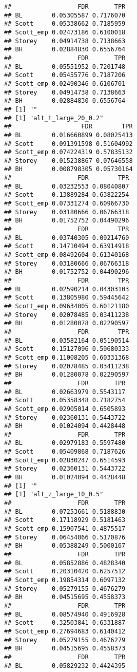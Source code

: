 \documentclass{article}\usepackage[]{graphicx}\usepackage[]{color}
\makeatletter
\newenvironment{kframe}{%
 \def\at@end@of@kframe{}%
 \ifinner\ifhmode%
  \def\at@end@of@kframe{\end{minipage}}%
  \begin{minipage}{\columnwidth}%
 \fi\fi%
 \def\FrameCommand##1{\hskip\@totalleftmargin \hskip-\fboxsep
 \colorbox{shadecolor}{##1}\hskip-\fboxsep
     \hskip-\linewidth \hskip-\@totalleftmargin \hskip\columnwidth}%
 \MakeFramed {\advance\hsize-\width
   \@totalleftmargin\z@ \linewidth\hsize
   \@setminipage}}%
 {\par\unskip\endMakeFramed%
 \at@end@of@kframe}
\newenvironment{knitrout}{}{} %
\makeatother
\begin{document}
\begin{knitrout}
\begin{kframe}
\begin{verbatim}
##                  FDR       TPR
## BL        0.05305587 0.7176070
## Scott     0.05338662 0.7185959
## Scott_emp 0.02473186 0.6100018
## Storey    0.04914738 0.7138663
## BH        0.02884830 0.6556764
##                  FDR       TPR
## BL        0.05551952 0.7201748
## Scott     0.05455776 0.7187206
## Scott_emp 0.02490346 0.6106701
## Storey    0.04914738 0.7138663
## BH        0.02884830 0.6556764
## [1] ""
## [1] "alt_t_large_20_0.2"
##                   FDR        TPR
## BL        0.016660899 0.08025413
## Scott     0.091391598 0.51604992
## Scott_emp 0.074224319 0.57835132
## Storey    0.015238867 0.07646558
## BH        0.008798305 0.05730164
##                  FDR        TPR
## BL        0.03232553 0.08040807
## Scott     0.13889284 0.63822254
## Scott_emp 0.07331274 0.60966730
## Storey    0.03180666 0.06766318
## BH        0.01752752 0.04490296
##                  FDR        TPR
## BL        0.03740305 0.09214760
## Scott     0.14710494 0.63914918
## Scott_emp 0.08492604 0.61340168
## Storey    0.03180666 0.06766318
## BH        0.01752752 0.04490296
##                  FDR        TPR
## BL        0.02590214 0.04303103
## Scott     0.13805980 0.59445642
## Scott_emp 0.09634005 0.60121180
## Storey    0.02078485 0.03411238
## BH        0.01280078 0.02290597
##                  FDR        TPR
## BL        0.03582164 0.05190514
## Scott     0.15127096 0.59680333
## Scott_emp 0.11008205 0.60331368
## Storey    0.02078485 0.03411238
## BH        0.01280078 0.02290597
##                  FDR       TPR
## BL        0.02663979 0.5543117
## Scott     0.05358348 0.7182754
## Scott_emp 0.02905014 0.6505893
## Storey    0.02360131 0.5443722
## BH        0.01024094 0.4428448
##                  FDR       TPR
## BL        0.02979183 0.5597480
## Scott     0.05409868 0.7187626
## Scott_emp 0.02830247 0.6514593
## Storey    0.02360131 0.5443722
## BH        0.01024094 0.4428448
## [1] ""
## [1] "alt_z_large_10_0.5"
##                  FDR       TPR
## BL        0.07253661 0.5188830
## Scott     0.17118929 0.5181463
## Scott_emp 0.15907541 0.4875517
## Storey    0.06454066 0.5170876
## BH        0.05388249 0.5000167
##                  FDR       TPR
## BL        0.05852886 0.4828340
## Scott     0.20310420 0.6257512
## Scott_emp 0.19854314 0.6097132
## Storey    0.05279155 0.4676279
## BH        0.04515695 0.4558373
##                  FDR       TPR
## BL        0.08574940 0.4916928
## Scott     0.32503841 0.6331887
## Scott_emp 0.27694683 0.6140412
## Storey    0.05279155 0.4676279
## BH        0.04515695 0.4558373
##                  FDR       TPR
## BL        0.05829232 0.4424395

\end{verbatim}
\end{kframe}
\end{knitrout}
\end{document}
